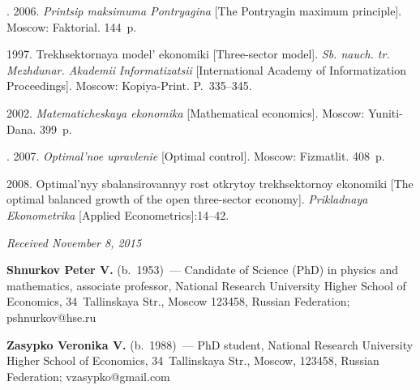 \begin{multicols}{2}
{{\begin{thebibliography}{99}
. 2006.
\textit{Printsip maksimuma Pontryagina} 
[The Pontryagin maximum principle]. Moscow: Fak\-to\-ri\-al.  144~p.



 1997. 
Trekhsektornaya model' ekonomiki [Three-sector model]. 
\textit{Sb. nauch. tr. Mezhdunar. Akademii} %
\textit{Informatizatsii}
[International Academy of Informatization Proceedings]. Moscow: Kopiya-Print.
P.~335--345.

 2002.
\textit{Matematicheskaya  ekonomika} [Mathematical economics]. Moscow: Yuniti-Dana.
399~p.

. 
2007. \textit{Optimal'noe upravlenie} [Optimal control]. Moscow: Fizmatlit. 408~p.

 2008.  
Optimal'nyy sbalansirovannyy rost otkrytoy trekhsektornoy ekonomiki 
[The optimal balanced growth of the open three-sector economy]. 
\textit{Prikladnaya Ekonometrika} [Applied Econometrics]:14--42.


\end{thebibliography}

 }
 }

\end{multicols}

\vspace*{-3pt}

\hfill{\small\textit{Received November 8, 2015}}

\Contr

\noindent
\textbf{Shnurkov Peter V.} (b.\ 1953)~--- 
Candidate of Science (PhD) in physics and mathematics, associate professor, 
National Research University Higher School of Economics, 34~Tallinskaya Str., 
Moscow 123458, Russian Federation; pshnurkov@hse.ru 

\vspace*{3pt}

\noindent
\textbf{Zasypko Veronika V.} (b.\ 1988)~--- 
PhD student, National Research University Higher School of Economics, 
34~Tallinskaya Str., Moscow, 123458, Russian Federation; vzasypko@gmail.com 

\vspace*{3pt}

